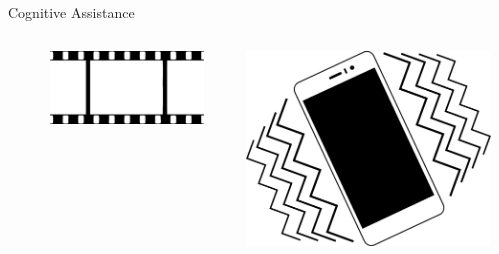 \documentclass[aspectratio=1610]{beamer}
\begin{document}
\begin{frame}{Cognitive Assistance}
\begin{columns}[onlytextwidth]
\begin{column}{.1\linewidth}
        \end{column}%
        \begin{column}{.01\linewidth}
        \end{column}%
        \begin{column}{.1\linewidth}
            \centering%
            \includegraphics[width=\linewidth]{img/film.png}
        \end{column}%
        \begin{column}{.01\linewidth}
        \end{column}%
        \begin{column}{.1\linewidth}
            \centering%
            \includegraphics[width=\linewidth]{img/vibration.png}
        \end{column}%
        \begin{column}{.335\linewidth}%
        \end{column}%
    \end{columns}
\end{frame}
\end{document}
